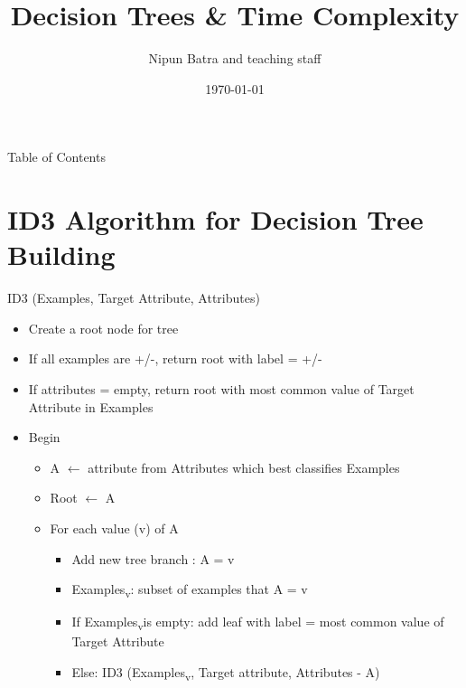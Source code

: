 \documentclass[dvipsnames]{beamer}
\title{Decision Trees \& Time Complexity}
\date{\today}
\author{Nipun Batra and teaching staff}
\institute{IIT Gandhinagar}
\begin{document}
\maketitle

\begin{frame}{Table of Contents}
    \tableofcontents[hideallsubsections]
\end{frame}

\section{ID3 Algorithm for Decision Tree Building}

\begin{frame}{ID3 (Examples, Target Attribute, Attributes)}
\begin{itemize}[<*>]
    \item Create a root node for tree
    \item If all examples are +/-, return root with label = +/-
    \item  If attributes = empty, return root with most common value of
    Target Attribute in Examples
    \item Begin
    \begin{itemize}[<*>]
        \item A $\leftarrow$ attribute from Attributes which best classifies
        Examples
        \item 	Root $\leftarrow$ A
        \item  For each value (v) of A
        \begin{itemize}[<*>]
            \item Add new tree branch : A = v
            \item  Examples\textsubscript{v}: subset of examples that A = v
            \item If Examples\textsubscript{v}is empty: add leaf with label = most
            common value of Target Attribute
            \item Else: ID3 (Examples\textsubscript{v}, Target attribute, Attributes - {A})
        \end{itemize}
    \end{itemize}
\end{itemize}
\end{frame}
\end{document}
